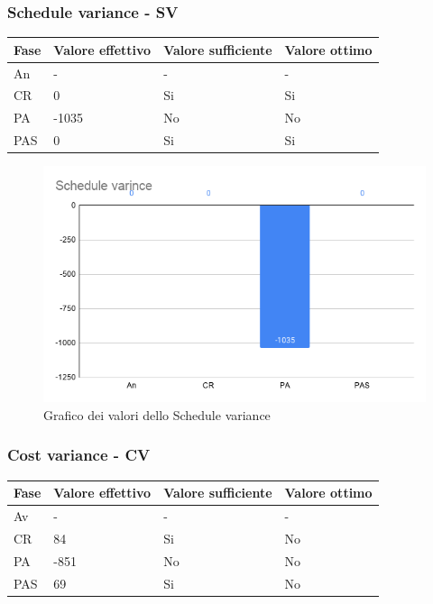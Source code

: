 \subsubsection{Schedule variance - SV}

\begin{longtabu} to \textwidth {| X[0.1,c m] | X[0.1,c m] | X[0.1,c m] | X[0.1,c m]|}
    \hline
    \textbf{Fase} &
    \textbf{Valore effettivo} & 
    \textbf{Valore sufficiente} & 
    \textbf{Valore ottimo} \\
    \hline
    An & - & - & - \\
    \hline
    CR & 0 & Si & Si \\ 
    \hline
    PA & -1035 & No & No \\
    \hline 
    PAS & 0 & Si & Si \\
    \hline
    \end{longtabu}

    \begin{figure}[H]
        \centering
        \includegraphics[width=10 cm]{source/sections/images/schedule_variance.png}
        \caption{Grafico dei valori dello Schedule variance}
    \end{figure}


\subsubsection{Cost variance - CV}
\begin{longtabu} to \textwidth {| X[0.1,c m] | X[0.1,c m] | X[0.1,c m] | X[0.1,c m]|}
    \hline
    \textbf{Fase} &
    \textbf{Valore effettivo} & 
    \textbf{Valore sufficiente} & 
    \textbf{Valore ottimo} \\
    \hline
    Av & - & - & - \\ 
    \hline
    CR & 84 & Si & No \\
    \hline
    PA & -851 & No & No \\
    \hline 
    PAS & 69 & Si & No \\
    \hline
    \end{longtabu}

